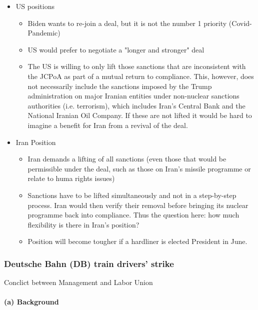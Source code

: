 \begin{itemize}
    \item US positions
        \begin{itemize}
            \item Biden wants to re-join a deal, but it is not the number 1
                priority (Covid-Pandemic)
            \item US would prefer to negotiate a "longer and stronger" deal
            \item The US is willing to only lift those sanctions that are
                inconsistent with the JCPoA as part of a mutual return to
                compliance. This, however, does not necessarily include the
                sanctions imposed by the Trump administration on major Iranian
                entities under non-nuclear sanctions authorities (i.e. terrorism),
                which includes Iran's Central Bank and the National Iranian
                Oil Company. If these are not lifted it would be hard to imagine
                a benefit for Iran from a revival of the deal.
        \end{itemize}
    \item Iran Position
        \begin{itemize}
            \item Iran demands a lifting of all sanctions (even those that
                would be permissible under the deal, such as those on Iran's
                missile programme or relate to huma rights issues)
            \item Sanctions have to be lifted simultaneously and not in a
                step-by-step process. Iran would then verify their removal
                before bringing its nuclear programme back into compliance.
                Thus the question here: how much flexibility is there in Iran's
                position?
            \item Position will become tougher if a hardliner is elected President
                in June.
        \end{itemize}
\end{itemize}

\subsubsection{Deutsche Bahn (DB) train drivers' strike}
Conclict between Management and Labor Union

\paragraph{(a) Background}

